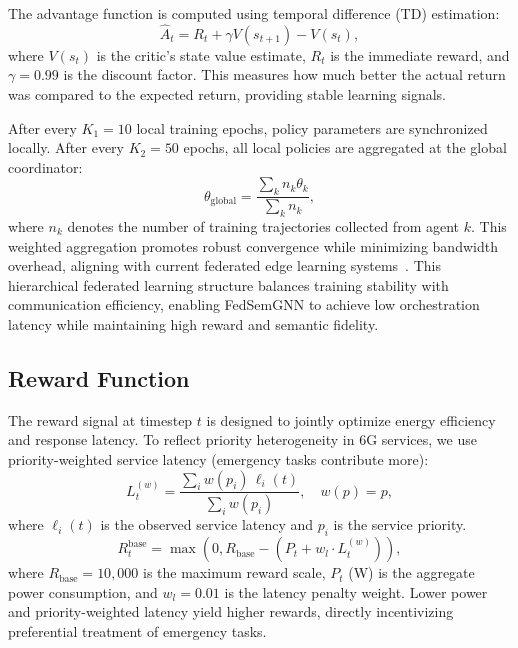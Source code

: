 \documentclass[conference]{IEEEtran}
\begin{document}
	The advantage function is computed using temporal difference (TD) estimation:
	\begin{equation}
		\hat{A}_t = R_t + \gamma V(s_{t+1}) - V(s_t),
	\end{equation}
	where $V(s_t)$ is the critic's state value estimate, $R_t$ is the immediate reward, and $\gamma = 0.99$ is the discount factor. This measures how much better the actual return was compared to the expected return, providing stable learning signals.
	
	After every $K_1 = 10$ local training epochs, policy parameters are synchronized locally. After every $K_2 = 50$ epochs, all local policies are aggregated at the global coordinator:
	\begin{equation}
		\theta_{\text{global}} = \frac{\sum_{k} n_k \theta_k}{\sum_{k} n_k},
	\end{equation}
	where $n_k$ denotes the number of training trajectories collected from agent $k$. This weighted aggregation promotes robust convergence while minimizing bandwidth overhead, aligning with current federated edge learning systems~\cite{zhou2024robustfl, yurdem2024federated}. This hierarchical federated learning structure balances training stability with communication efficiency, enabling FedSemGNN to achieve low orchestration latency while maintaining high reward and semantic fidelity.
	
	\subsection{Reward Function}
	The reward signal at timestep $t$ is designed to jointly optimize energy efficiency and response latency. To reflect priority heterogeneity in 6G services, we use priority-weighted service latency (emergency tasks contribute more):
	\begin{equation}
	L_t^{(w)} = \frac{\sum_i w(p_i)\,\ell_i(t)}{\sum_i w(p_i)},\quad w(p)=p, 
	\end{equation}
	where $\ell_i(t)$ is the observed service latency and $p_i$ is the service priority.
	\begin{equation}
		R_t^{\text{base}} = \max\!\left(0, R_{\text{base}} - \left(P_t + w_l \cdot L_t^{(w)}\right)\right),
		\label{eq:base_reward}
	\end{equation}
	where $R_{\text{base}} = 10{,}000$ is the maximum reward scale, $P_t$ (W) is the aggregate power consumption, and $w_l = 0.01$ is the latency penalty weight. Lower power and priority-weighted latency yield higher rewards, directly incentivizing preferential treatment of emergency tasks.
	
\end{document}
